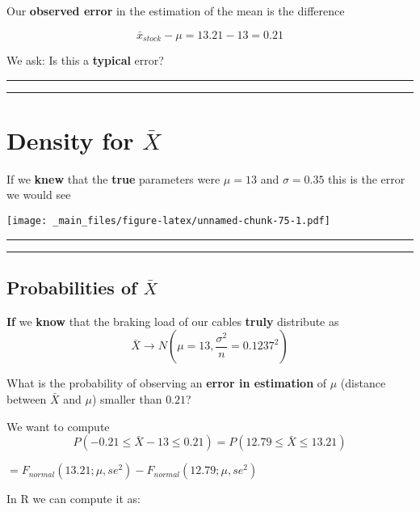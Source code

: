 \documentclass[
]{book}
\begin{document}
Our \textbf{observed error} in the estimation of the mean is the difference

\[\bar{x}_{stock}-\mu=13.21-13=0.21\]

We ask: Is this a \textbf{typical} error?

\begin{center}\rule{0.5\linewidth}{0.5pt}\end{center}

\begin{center}\rule{0.5\linewidth}{0.5pt}\end{center}

\hypertarget{density-for-barx}{%
\section{\texorpdfstring{Density for \(\bar{X}\)}{Density for \textbackslash bar\{X\}}}\label{density-for-barx}}

If we \textbf{knew} that the \textbf{true} parameters were \(\mu=13\) and \(\sigma=0.35\) this is the error we would see

\texttt{[image: \_main\_files/figure-latex/unnamed-chunk-75-1.pdf]}

\begin{center}\rule{0.5\linewidth}{0.5pt}\end{center}

\begin{center}\rule{0.5\linewidth}{0.5pt}\end{center}

\hypertarget{probabilities-of-barx}{%
\subsection{\texorpdfstring{Probabilities of \(\bar{X}\)}{Probabilities of \textbackslash bar\{X\}}}\label{probabilities-of-barx}}

\textbf{If} we \textbf{know} that the braking load of our cables \textbf{truly} distribute as \[\bar{X} \rightarrow N(\mu=13, \frac{\sigma^2}{n}=0.1237^2)\]

What is the probability of observing an \textbf{error in estimation} of \(\mu\) (distance between \(\bar{X}\) and \(\mu\)) smaller than \(0.21\)?

We want to compute \[P(-0.21 \leq \bar{X} - 13\leq 0.21)=P(12.79 \leq \bar{X} \leq 13.21)\]

\(=F_{normal}(13.21; \mu, se^2)-F_{normal}(12.79; \mu, se^2)\)

In R we can compute it as:
\end{document}
